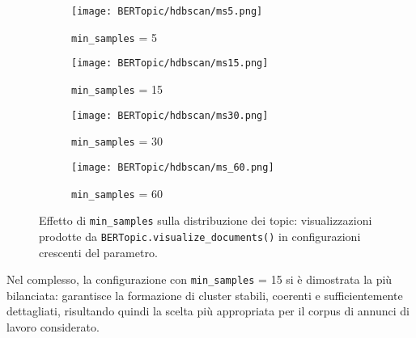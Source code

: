 \begin{figure}[H]
\centering
\begin{subfigure}{0.24\textwidth}
    \centering
    \texttt{[image: BERTopic/hdbscan/ms5.png]}
    \caption{\texttt{min\_samples} = 5}
\end{subfigure}\hfill
\begin{subfigure}{0.24\textwidth}
    \centering
    \texttt{[image: BERTopic/hdbscan/ms15.png]}
    \caption{\texttt{min\_samples} = 15}
\end{subfigure}\hfill
\begin{subfigure}{0.24\textwidth}
    \centering
    \texttt{[image: BERTopic/hdbscan/ms30.png]}
    \caption{\texttt{min\_samples} = 30}
\end{subfigure}\hfill
\begin{subfigure}{0.24\textwidth}
    \centering
    \texttt{[image: BERTopic/hdbscan/ms\_60.png]}
    \caption{\texttt{min\_samples} = 60}
\end{subfigure}
\caption{Effetto di \texttt{min\_samples} sulla distribuzione dei topic: visualizzazioni prodotte da \texttt{BERTopic.visualize\_documents()} in configurazioni crescenti del parametro.}
\label{fig:min-samples-umap}
\end{figure}

Nel complesso, la configurazione con \texttt{min\_samples} = 15 si è dimostrata la più bilanciata: 
garantisce la formazione di cluster stabili, coerenti e sufficientemente dettagliati, risultando quindi la scelta più appropriata per il corpus di annunci di lavoro considerato.
